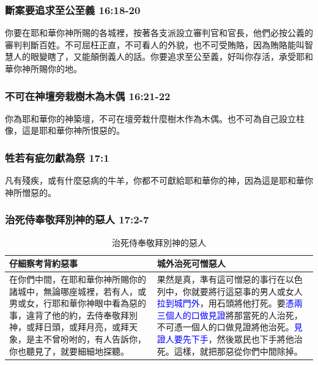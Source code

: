 \subsubsection{斷案要追求至公至義 16:18-20}
你要在耶和華你神所賜的各城裡，按著各支派設立審判官和官長，他們必按公義的審判判斷百姓。不可屈枉正直，不可看人的外貌，也不可受賄賂，因為賄賂能叫智慧人的眼變瞎了，又能顛倒義人的話。你要追求至公至義，好叫你存活，承受耶和華你神所賜你的地。

\subsubsection{不可在神壇旁栽樹木為木偶 16:21-22}
你為耶和華你的神築壇，不可在壇旁栽什麼樹木作為木偶。也不可為自己設立柱像，這是耶和華你神所恨惡的。

\subsubsection{牲若有疵勿獻為祭 17:1}
凡有殘疾，或有什麼惡病的牛羊，你都不可獻給耶和華你的神，因為這是耶和華你神所憎惡的。

\subsubsection{治死侍奉敬拜別神的惡人 17:2-7}
\begin{table}[H]
\begin{center}
\begin{tabular}{ p{8cm}|p{9cm} } \toprule
仔細察考背約惡事&城外治死可憎惡人\\\hline
在你們中間，在耶和華你神所賜你的諸城中，無論哪座城裡，若有人，或男或女，行耶和華你神眼中看為惡的事，違背了他的約，去侍奉敬拜別神，或拜日頭，或拜月亮，或拜天象，是主不曾吩咐的，有人告訴你，你也聽見了，就要細細地探聽。&果然是真，準有這可憎惡的事行在以色列中，你就要將行這惡事的男人或女人\textcolor{blue}{拉到城門外}，用石頭將他打死。要\textcolor{blue}{憑兩三個人的口做見證}將那當死的人治死，不可憑一個人的口做見證將他治死。\textcolor{blue}{見證人要先下手}，然後眾民也下手將他治死。這樣，就把那惡從你們中間除掉。\\\hline
\end{tabular}
\end{center}
\caption{治死侍奉敬拜別神的惡人}
\end{table}


